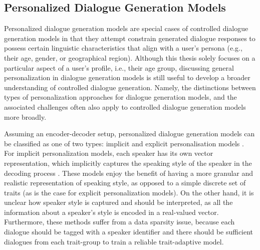 
\subsection{Personalized Dialogue Generation Models}
Personalized dialogue generation models are special cases of controlled dialogue generation models in that they attempt constrain generated dialogue responses to possess certain linguistic characteristics that align with a user's persona (e.g., their age, gender, or geographical region).
Although this thesis solely focuses on a particular aspect of a user's profile, i.e., their age group, discussing general personalization in dialogue generation models is still useful to develop a broader understanding of controlled dialogue generation. Namely, the distinctions between types of personalization approaches for dialogue generation models, and the associated challenges often also apply to controlled dialogue generation models more broadly.

Assuming an encoder-decoder setup, personalized dialogue generation models can be classified as one of two types: implicit and explicit personalisation models \cite{zheng2019personalized}. For implicit personalization models, each speaker has its own vector representation, which implicitly captures the speaking style of the speaker in the decoding process \citep{ijcai2017-521, li-etal-2016-persona}. These models enjoy the benefit of having a more granular and realistic representation of speaking style, as opposed to a simple discrete set of traits (as is the case for explicit personalization models). On the other hand, it is unclear how speaker style is captured and should be interpreted, as all the information about a speaker's style is encoded in a real-valued vector. Furthermore, these methods suffer from a data sparsity issue, because each dialogue should be tagged with a speaker identifier and there should be sufficient dialogues from each trait-group to train a reliable trait-adaptive model. 

